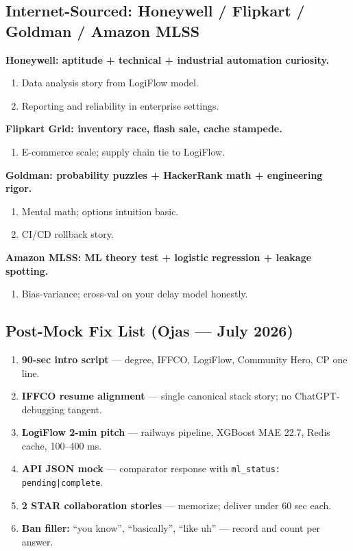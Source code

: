 \documentclass[9pt,a4paper]{article}
\begin{document}
\subsection{Internet-Sourced: Honeywell / Flipkart / Goldman / Amazon MLSS}
\textbf{Honeywell: aptitude + technical + industrial automation curiosity.}
\begin{enumerate}[label=\textit{Probe \arabic*:}]
  \item Data analysis story from LogiFlow model.
  \item Reporting and reliability in enterprise settings.
\end{enumerate}
\vspace{2mm}
\textbf{Flipkart Grid: inventory race, flash sale, cache stampede.}
\begin{enumerate}[label=\textit{Probe \arabic*:}]
  \item E-commerce scale; supply chain tie to LogiFlow.
\end{enumerate}
\vspace{2mm}
\textbf{Goldman: probability puzzles + HackerRank math + engineering rigor.}
\begin{enumerate}[label=\textit{Probe \arabic*:}]
  \item Mental math; options intuition basic.
  \item CI/CD rollback story.
\end{enumerate}
\vspace{2mm}
\textbf{Amazon MLSS: ML theory test + logistic regression + leakage spotting.}
\begin{enumerate}[label=\textit{Probe \arabic*:}]
  \item Bias-variance; cross-val on your delay model honestly.
\end{enumerate}
\vspace{2mm}

\subsection{Post-Mock Fix List (Ojas --- July 2026)}
\begin{enumerate}
  \item \textbf{90-sec intro script} --- degree, IFFCO, LogiFlow, Community Hero, CP one line.
  \item \textbf{IFFCO resume alignment} --- single canonical stack story; no ChatGPT-debugging tangent.
  \item \textbf{LogiFlow 2-min pitch} --- railways pipeline, XGBoost MAE 22.7, Redis cache, 100--400 ms.
  \item \textbf{API JSON mock} --- comparator response with \texttt{ml\_status: pending|complete}.
  \item \textbf{2 STAR collaboration stories} --- memorize; deliver under 60 sec each.
  \item \textbf{Ban filler:} ``you know'', ``basically'', ``like uh'' --- record and count per answer.
\end{enumerate}
\end{document}
